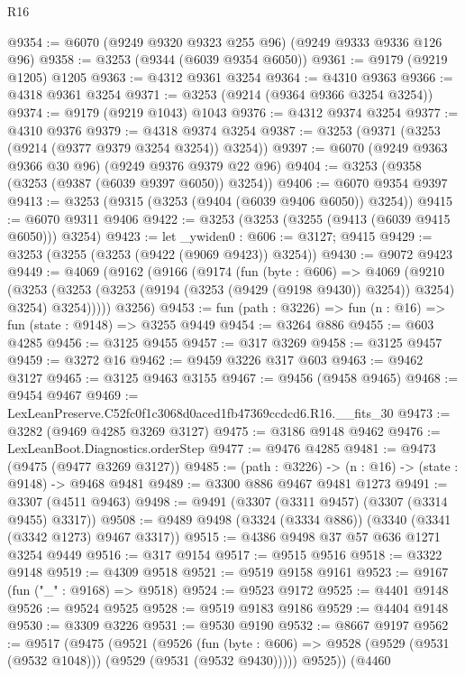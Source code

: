 \begin{lexlean}{R16}
\begin{coremodule}
@9354 := @6070 (@9249 @9320 @9323 @255 @96) (@9249 @9333 @9336 @126 @96)
@9358 := @3253 (@9344 (@6039 @9354 @6050))
@9361 := @9179 (@9219 @1205) @1205
@9363 := @4312 @9361 @3254
@9364 := @4310 @9363
@9366 := @4318 @9361 @3254
@9371 := @3253 (@9214 (@9364 @9366 @3254 @3254))
@9374 := @9179 (@9219 @1043) @1043
@9376 := @4312 @9374 @3254
@9377 := @4310 @9376
@9379 := @4318 @9374 @3254
@9387 := @3253 (@9371 (@3253 (@9214 (@9377 @9379 @3254 @3254)) @3254))
@9397 := @6070 (@9249 @9363 @9366 @30 @96) (@9249 @9376 @9379 @22 @96)
@9404 := @3253 (@9358 (@3253 (@9387 (@6039 @9397 @6050)) @3254))
@9406 := @6070 @9354 @9397
@9413 := @3253 (@9315 (@3253 (@9404 (@6039 @9406 @6050)) @3254))
@9415 := @6070 @9311 @9406
@9422 := @3253 (@3253 (@3255 (@9413 (@6039 @9415 @6050))) @3254)
@9423 := let _ywiden0 : @606 := @3127; @9415
@9429 := @3253 (@3255 (@3253 (@9422 (@9069 @9423)) @3254))
@9430 := @9072 @9423
@9449 := @4069
    (@9162
      (@9166
        (@9174
          (fun (byte : @606) =>
          @4069
            (@9210
              (@3253
                (@3253 (@3253 (@9194 (@3253 (@9429 (@9198 @9430)) @3254)) @3254) @3254)
                @3254)))))
      @3256)
@9453 := fun (path : @3226) => fun (n : @16) => fun (state : @9148) => @3255 @9449
@9454 := @3264 @886
@9455 := @603 @4285
@9456 := @3125 @9455
@9457 := @317 @3269
@9458 := @3125 @9457
@9459 := @3272 @16
@9462 := @9459 @3226 @317 @603
@9463 := @9462 @3127
@9465 := @3125 @9463 @3155
@9467 := @9456 (@9458 @9465)
@9468 := @9454 @9467
@9469 := LexLeanPreserve.C52fc0f1c3068d0aced1fb47369ccdcd6.R16.__fits_30
@9473 := @3282 (@9469 @4285 @3269 @3127)
@9475 := @3186 @9148 @9462
@9476 := LexLeanBoot.Diagnostics.orderStep
@9477 := @9476 @4285
@9481 := @9473 (@9475 (@9477 @3269 @3127))
@9485 := (path : @3226) -> (n : @16) -> (state : @9148) -> @9468 @9481
@9489 := @3300 @886 @9467 @9481 @1273
@9491 := @3307 (@4511 @9463)
@9498 := @9491 (@3307 (@3311 @9457) (@3307 (@3314 @9455) @3317))
@9508 := @9489 @9498 (@3324 (@3334 @886)) (@3340 (@3341 (@3342 @1273) @9467 @3317))
@9515 := @4386 @9498 @37 @57 @636 @1271 @3254 @9449
@9516 := @317 @9154
@9517 := @9515 @9516
@9518 := @3322 @9148
@9519 := @4309 @9518
@9521 := @9519 @9158 @9161
@9523 := @9167 (fun ("_" : @9168) => @9518)
@9524 := @9523 @9172
@9525 := @4401 @9148
@9526 := @9524 @9525
@9528 := @9519 @9183 @9186
@9529 := @4404 @9148
@9530 := @3309 @3226
@9531 := @9530 @9190
@9532 := @8667 @9197
@9562 := @9517
    (@9475
      (@9521
        (@9526
          (fun (byte : @606) => @9528 (@9529 (@9531 (@9532 @1048))) (@9529 (@9531 (@9532 @9430)))))
        @9525))
    (@4460

\end{coremodule}
\end{lexlean}
